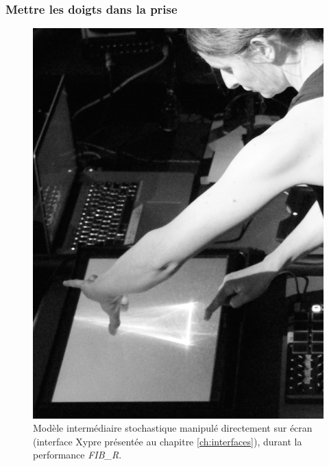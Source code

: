\subsubsection{Mettre les doigts dans la prise}
\begin{figure}[!htbp]
	\captionsetup{format=plain}%
	\includegraphics[width=\textwidth]{gfx/06_visual_representation/Xypre-Live.jpg}
	\caption[Modèle intermédiaire stochastique manipulé sur écran]{Modèle intermédiaire stochastique manipulé directement sur écran (interface Xypre présentée au chapitre \ref{ch:interfaces}), durant la performance \textit{FIB\_R}.}
	\label{fig:visual_representation:xypre-live}
\end{figure}

